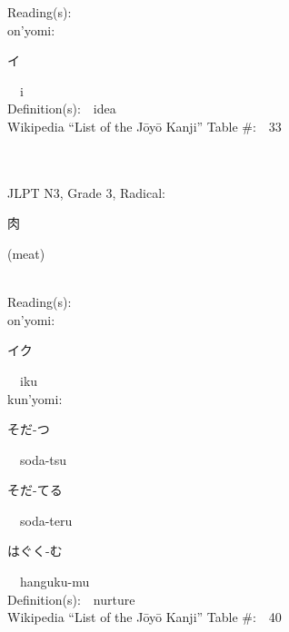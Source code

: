 \begin{multicols}{2}
Reading(s):\ \ \\
{\hspace*{1em}}on'yomi:\ \ \\
{\hspace*{2em}}{\begin{CJK}{UTF8}{min} イ \end{CJK}}\ \ i\ \ \\
Definition(s):\ \ idea \\
Wikipedia ``List of the J\=oy\=o Kanji'' Table \#:\ \ 33 \\
\ \ \\
{\fontsize{34pt}{40pt}  }\ \ \\  %
{JLPT N3, Grade 3, Radical:\ \ {\begin{CJK}{UTF8}{min} 肉 \end{CJK}} (meat) } \\
Reading(s):\ \ \\
{\hspace*{1em}}on'yomi:\ \ \\
{\hspace*{2em}}{\begin{CJK}{UTF8}{min} イク \end{CJK}}\ \ iku\ \ \\
{\hspace*{1em}}kun'yomi:\ \ \\
{\hspace*{2em}}{\begin{CJK}{UTF8}{min} そだ-つ \end{CJK}}\ \ soda-tsu\ \ \\
{\hspace*{2em}}{\begin{CJK}{UTF8}{min} そだ-てる \end{CJK}}\ \ soda-teru\ \ \\
{\hspace*{2em}}{\begin{CJK}{UTF8}{min} はぐく-む \end{CJK}}\ \ hanguku-mu\ \ \\
Definition(s):\ \ nurture \\
Wikipedia ``List of the J\=oy\=o Kanji'' Table \#:\ \ 40 \\
\ \ \\
{\fontsize{34pt}{40pt}  }\ \ \\  %

\end{multicols}
